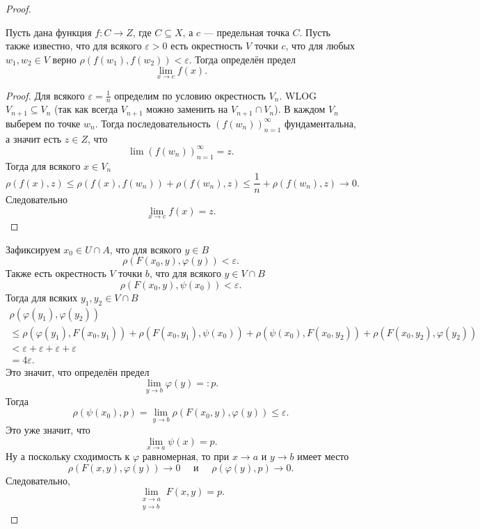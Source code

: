 \documentclass[12pt,a4paper]{article}
\begin{document}
    \begin{proof}
        \begin{thlemma}
            Пусть дана функция $f: C \to Z$, где $C \subseteq X$, а $c$ --- предельная точка $C$. Пусть также известно, что для всякого $\varepsilon > 0$ есть окрестность $V$ точки $c$, что для любых $w_1, w_2 \in V$ верно $\rho(f(w_1), f(w_2)) < \varepsilon$. Тогда определён предел
            \[\lim_{x \to c} f(x).\]
        \end{thlemma}

        \begin{proof}
            Для всякого $\varepsilon = \frac{1}{n}$ определим по условию окрестность $V_n$. WLOG $V_{n+1} \subseteq V_n$ (так как всегда $V_{n+1}$ можно заменить на $V_{n+1} \cap V_n$). В каждом $V_n$ выберем по точке $w_n$. Тогда последовательность $(f(w_n))_{n=1}^\infty$ фундаментальна, а значит есть $z \in Z$, что
            \[\lim (f(w_n))_{n=1}^\infty = z.\]
            Тогда для всякого $x \in V_n$
            \[\rho(f(x), z) \leqslant \rho(f(x), f(w_n)) + \rho(f(w_n), z) \leqslant \frac{1}{n} + \rho(f(w_n), z) \to 0.\]
            Следовательно
            \[\lim_{x \to c} f(x) = z.\]
        \end{proof}

        Зафиксируем $x_0 \in U \cap A$, что для всякого $y \in B$
        \[\rho(F(x_0, y), \varphi(y)) < \varepsilon.\]
        Также есть окрестность $V$ точки $b$, что для всякого $y \in V \cap B$
        \[\rho(F(x_0, y), \psi(x_0)) < \varepsilon.\]
        Тогда для всяких $y_1, y_2 \in V \cap B$
        \begin{multline*}
            \rho(\varphi(y_1), \varphi(y_2))\\
            \leqslant \rho(\varphi(y_1), F(x_0, y_1)) + \rho(F(x_0, y_1), \psi(x_0)) + \rho(\psi(x_0), F(x_0, y_2)) + \rho(F(x_0, y_2), \varphi(y_2))\\
            < \varepsilon + \varepsilon + \varepsilon + \varepsilon\\
            = 4 \varepsilon.
        \end{multline*}
        Это значит, что определён предел
        \[\lim_{y \to b} \varphi(y) =: p.\]
        Тогда
        \[\rho(\psi(x_0), p) = \lim_{y \to b} \rho(F(x_0, y), \varphi(y)) \leqslant \varepsilon.\]
        Это уже значит, что
        \[\lim_{x \to a} \psi(x) = p.\]
        Ну а поскольку сходимость к $\varphi$ равномерная, то при $x \to a$ и $y \to b$ имеет место
        \[\rho(F(x, y), \varphi(y)) \to 0 \quad \text{ и } \quad \rho(\varphi(y), p) \to 0.\]
        Следовательно,
        \[\lim_{\substack{x \to a \\ y \to b}} F(x, y) = p.\]
    \end{proof}
\end{document}
